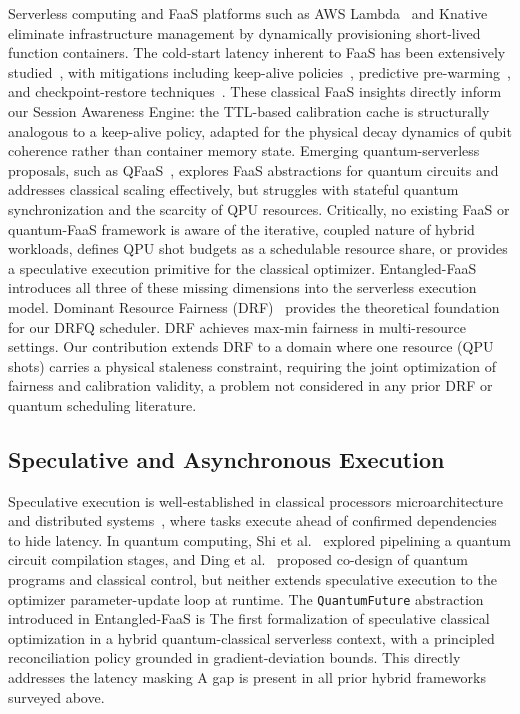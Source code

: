 \documentclass[conference]{IEEEtran}
\begin{document}
Serverless computing and FaaS platforms such as AWS
Lambda~\cite{jonas2019cloud} and Knative~\cite{knative2023} eliminate
infrastructure management by dynamically provisioning short-lived
function containers. The cold-start latency inherent to FaaS has been
extensively studied~\cite{wang2018peeking,shahrad2020serverless}, with
mitigations including keep-alive
policies~\cite{gunasekaran2020fifer}, predictive
pre-warming~\cite{lin2019mitigating}, and checkpoint-restore
techniques~\cite{du2020catalyzer}. These classical FaaS insights
directly inform our Session Awareness Engine: the TTL-based calibration
cache is structurally analogous to a keep-alive policy, adapted for the
physical decay dynamics of qubit coherence rather than container memory
state.
Emerging quantum-serverless proposals, such as
QFaaS~\cite{nguyen_qfaas_2024}, explores FaaS abstractions for quantum
circuits and addresses classical scaling effectively, but struggles with
stateful quantum synchronization and the scarcity of QPU resources.
Critically, no existing FaaS or quantum-FaaS framework is aware of the iterative, coupled nature of hybrid workloads, defines QPU shot budgets
as a schedulable resource share, or provides a speculative execution
primitive for the classical optimizer. Entangled-FaaS introduces all
three of these missing dimensions into the serverless execution model.
Dominant Resource Fairness (DRF)~\cite{ghodsi2011drf} provides the
theoretical foundation for our DRFQ scheduler. DRF achieves max-min
fairness in multi-resource settings. Our contribution extends DRF to a domain where one resource (QPU shots)
carries a physical staleness constraint, requiring the joint
optimization of fairness and calibration validity, a problem not
considered in any prior DRF or quantum scheduling literature.

\subsection{Speculative and Asynchronous Execution}
\label{subsec:related_speculative}

Speculative execution is well-established in classical processors
microarchitecture~\cite{hennessy2017computer} and distributed
systems~\cite{dean2013tail}, where tasks execute ahead of confirmed
dependencies to hide latency. In quantum computing, Shi et
al.~\cite{shi2020resource} explored pipelining a quantum circuit
compilation stages, and Ding et al.~\cite{ding2020systematic} proposed
co-design of quantum programs and classical control, but neither extends
speculative execution to the optimizer parameter-update loop at runtime.
The \texttt{QuantumFuture} abstraction introduced in Entangled-FaaS is
The first formalization of speculative classical optimization in a
hybrid quantum-classical serverless context, with a principled
reconciliation policy grounded in gradient-deviation bounds. This directly addresses the latency masking
A gap is present in all prior hybrid frameworks surveyed above.
\end{document}
